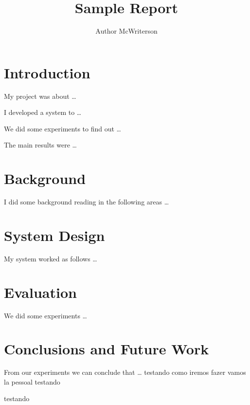 \documentclass[a4paper, 11pt]{article}
\title{Sample Report}
\author{Author McWriterson}
\begin{document}
\maketitle
\tableofcontents

\section{Introduction}

My project was about \ldots

I developed a system to \ldots

We did some experiments to find out \ldots

The main results were \ldots

\pagebreak

\section{Background}

I did some background reading in the following areas \ldots

\pagebreak

\section{System Design}

My system worked as follows \ldots

\pagebreak

\section{Evaluation}

We did some experiments \ldots

\pagebreak

\section{Conclusions and Future Work}

From our experiments we can conclude that \ldots
testando como iremos fazer vamos la pessoal
testando

testando


\end{document}
